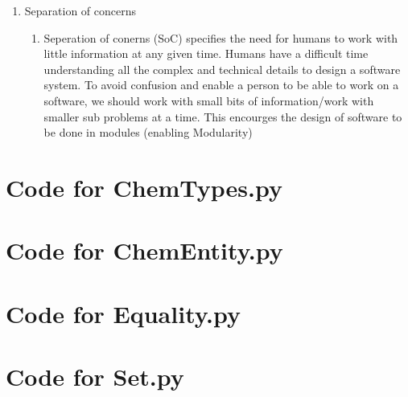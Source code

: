 \documentclass[12pt]{article}
\begin{document}
\begin{enumerate}[a)]
\begin{enumerate}
		\item Separation of concerns
			\begin{enumerate}
					\item Seperation of conerns (SoC) specifies the need for humans to work with little information at any given time. Humans have a  difficult time understanding all the complex and technical details to design a software system. To avoid confusion and enable a person to be able to work on a software, we should work with small bits of information/work with smaller sub problems at a time. This encourges the design of software to be done in modules (enabling Modularity)
			\end{enumerate}
	\end{enumerate}
  
\end{enumerate}

\newpage

\lstset{language=Python, basicstyle=\tiny, breaklines=true, showspaces=false,
  showstringspaces=false, breakatwhitespace=true}

\def\thesection{\Alph{section}}

\section{Code for ChemTypes.py}

\noindent 

\newpage

\section{Code for ChemEntity.py}

\noindent 

\newpage

\section{Code for Equality.py}

\noindent 

\newpage

\section{Code for Set.py}
\end{document}
